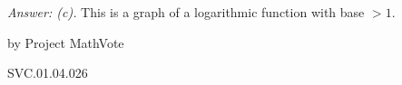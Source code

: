 
{\it Answer: (c).}  This is a graph of a logarithmic function with base $>1$.

\medskip
by Project MathVote

SVC.01.04.026

